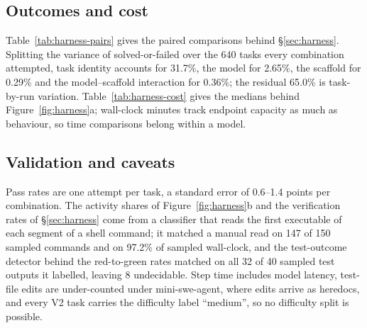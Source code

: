 \subsection{Outcomes and cost}


Table~\ref{tab:harness-pairs} gives the paired comparisons behind \S\ref{sec:harness}. Splitting the variance of solved-or-failed over the 640 tasks every combination attempted, task identity accounts for 31.7\%, the model for 2.65\%, the scaffold for 0.29\% and the model--scaffold interaction for 0.36\%; the residual 65.0\% is task-by-run variation. Table~\ref{tab:harness-cost} gives the medians behind Figure~\ref{fig:harness}a; wall-clock minutes track endpoint capacity as much as behaviour, so time comparisons belong within a model.

\subsection{Validation and caveats}
\label{app:harness-validation}
Pass rates are one attempt per task, a standard error of 0.6--1.4 points per combination. The activity shares of Figure~\ref{fig:harness}b and the verification rates of \S\ref{sec:harness} come from a classifier that reads the first executable of each segment of a shell command; it matched a manual read on 147 of 150 sampled commands and on 97.2\% of sampled wall-clock, and the test-outcome detector behind the red-to-green rates matched on all 32 of 40 sampled test outputs it labelled, leaving 8 undecidable. Step time includes model latency, test-file edits are under-counted under mini-swe-agent, where edits arrive as heredocs, and every V2 task carries the difficulty label ``medium'', so no difficulty split is possible.
